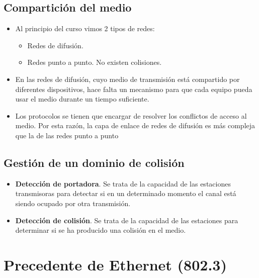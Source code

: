 \documentclass{article}
\begin{document}
\subsection{Compartición del medio}
\label{sec:org6ed8d28}
\begin{itemize}
\item Al principio del curso vimos 2 tipos de redes:
\begin{itemize}
\item Redes de difusión.
\item Redes punto a punto. No existen colisiones.
\end{itemize}
\item En las redes de difusión, cuyo medio de transmisión está compartido por diferentes dispositivos, hace falta un mecanismo para que cada equipo pueda usar el medio durante un tiempo suficiente.
\item Los protocolos se tienen que encargar de resolver los conflictos de acceso al medio.  Por esta razón, la capa de enlace de redes de difusión es más compleja que la de las redes punto a punto
\end{itemize}


\subsection{Gestión de un dominio de colisión}
\label{sec:org59faeab}
\begin{itemize}
\item \textbf{Detección de portadora}. Se trata de la capacidad de las estaciones transmisoras para detectar si en un determinado momento el canal está siendo ocupado por otra transmisión.
\item \textbf{Detección de colisión}. Se trata de la capacidad de las estaciones para determinar si se ha producido una colisión en el medio.
\end{itemize}


\section{Precedente de Ethernet (802.3)}
\label{sec:org713c787}
\end{document}
